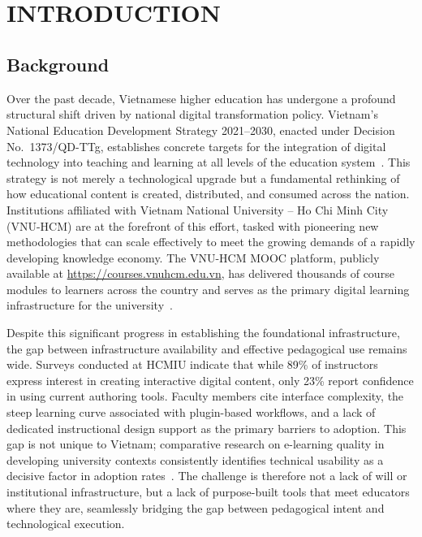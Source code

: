 
\chapter{\\INTRODUCTION}
\section{Background}

Over the past decade, Vietnamese higher education has undergone a profound structural shift driven by national digital transformation policy. Vietnam's National Education Development Strategy 2021--2030, enacted under Decision No.~1373/QD-TTg, establishes concrete targets for the integration of digital technology into teaching and learning at all levels of the education system~\cite{vietnam_strategy2021}. This strategy is not merely a technological upgrade but a fundamental rethinking of how educational content is created, distributed, and consumed across the nation. Institutions affiliated with Vietnam National University -- Ho Chi Minh City (VNU-HCM) are at the forefront of this effort, tasked with pioneering new methodologies that can scale effectively to meet the growing demands of a rapidly developing knowledge economy. The VNU-HCM MOOC platform, publicly available at \url{https://courses.vnuhcm.edu.vn}, has delivered thousands of course modules to learners across the country and serves as the primary digital learning infrastructure for the university~\cite{vnuhcm_mooc}. 

Despite this significant progress in establishing the foundational infrastructure, the gap between infrastructure availability and effective pedagogical use remains wide. Surveys conducted at HCMIU indicate that while 89\% of instructors express interest in creating interactive digital content, only 23\% report confidence in using current authoring tools. Faculty members cite interface complexity, the steep learning curve associated with plugin-based workflows, and a lack of dedicated instructional design support as the primary barriers to adoption. This gap is not unique to Vietnam; comparative research on e-learning quality in developing university contexts consistently identifies technical usability as a decisive factor in adoption rates~\cite{hadullo2017}. The challenge is therefore not a lack of will or institutional infrastructure, but a lack of purpose-built tools that meet educators where they are, seamlessly bridging the gap between pedagogical intent and technological execution.

